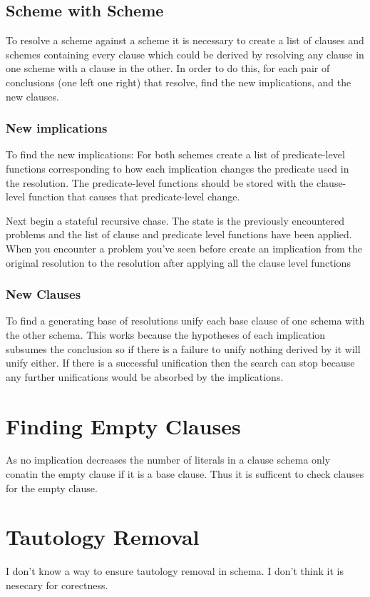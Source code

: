 \documentclass{article}
\begin{document}
\subsection{Scheme with Scheme}


    To resolve a scheme against a scheme it is necessary to create a list of clauses and schemes containing every clause which could be derived by resolving any clause in one scheme with a clause in the other.
    In order to do this, for each pair of conclusions (one left one right) that resolve, find the new implications, and the new clauses.

\subsubsection{New implications}
  
  To find the new implications: For both schemes create a list of predicate-level functions corresponding to how each implication changes the predicate
  used in the resolution.
  The predicate-level functions should be stored with the clause-level function that causes that predicate-level change.

  Next begin a stateful recursive chase.
    The state is the previously encountered problems and the list of clause and predicate level functions have been applied.
    When you encounter a problem you've seen before create an implication
    from the original resolution to the resolution after applying all the clause level functions

\subsubsection{New Clauses}

          To find a generating base of resolutions unify each base clause of one schema with the other schema.
             This works because the hypotheses of each implication subsumes the conclusion so if there is a failure to unify nothing derived by it will unify either.
             If there is a successful unification then the search can stop because any further unifications would be absorbed by the implications.

\section{Finding Empty Clauses}
  As no implication decreases the number of literals in a clause schema only conatin the empty clause if it is a base clause.
  Thus it is sufficent to check clauses for the empty clause.

\section{Tautology Removal}
  I don't know a way to ensure tautology removal in schema.
  I don't think it is nesecary for corectness.
  
\end{document}
